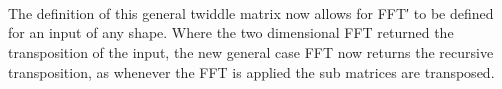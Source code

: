 \begin{AgdaAlign}
\begin{code}
\AgdaSpace{}%
\AgdaSymbol{(}\AgdaSpace{}%
\AgdaSymbol{(}\AgdaSpace{}%
\AgdaSpace{}%
\AgdaSymbol{))}\AgdaSpace{}%
\AgdaSymbol{(}\AgdaSpace{}%
\AgdaSymbol{)}\<%
\end{code}
\begin{code}[hide]%
\>[2][@{}l@{\AgdaIndent{1}}]%
\>[6]\<%
\\
\>[6][@{}l@{\AgdaIndent{0}}]%
\>[8]\<%
\\
\>[8][@{}l@{\AgdaIndent{0}}]%
\>[10]\<%
\\
\>[10][@{}l@{\AgdaIndent{0}}]%
\>[12]\AgdaSymbol{\AgdaUnderscore{}}\AgdaSpace{}%
\AgdaSymbol{:}\AgdaSpace{}%
\AgdaSpace{}%
\AgdaSymbol{(}\AgdaSpace{}%
\AgdaSpace{}%
\AgdaSpace{}%
\AgdaSpace{}%
\AgdaSymbol{)}\<%
\end{code}
\end{AgdaAlign}

The definition of this general twiddle matrix now allows for FFT′ to be defined
for an input of any shape.
Where the two dimensional FFT returned the transposition of the input, the new
general case FFT now returns the recursive transposition, as whenever the FFT is
applied the sub matrices are transposed.

